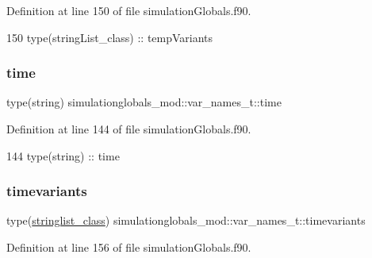 Definition at line 150 of file simulation\+Globals.\+f90.


\begin{DoxyCode}
150         \textcolor{keywordtype}{type}(stringList\_class) :: tempVariants
\end{DoxyCode}
\mbox{\label{structsimulationglobals__mod_1_1var__names__t_a3826ddc89095f68c7ff6ee007adaaa45}} 
\subsubsection{\texorpdfstring{time}{time}}
{\footnotesize\ttfamily type(string) simulationglobals\+\_\+mod\+::var\+\_\+names\+\_\+t\+::time\hspace{0.3cm}{\ttfamily [private]}}



Definition at line 144 of file simulation\+Globals.\+f90.


\begin{DoxyCode}
144         \textcolor{keywordtype}{type}(string) :: time
\end{DoxyCode}
\mbox{\label{structsimulationglobals__mod_1_1var__names__t_a983950f023530bcc71b0a6d2d0037cbc}} 
\subsubsection{\texorpdfstring{timevariants}{timevariants}}
{\footnotesize\ttfamily type(\mbox{\hyperlink{structsimulationglobals__mod_1_1stringlist__class}{stringlist\+\_\+class}}) simulationglobals\+\_\+mod\+::var\+\_\+names\+\_\+t\+::timevariants\hspace{0.3cm}{\ttfamily [private]}}



Definition at line 156 of file simulation\+Globals.\+f90.


